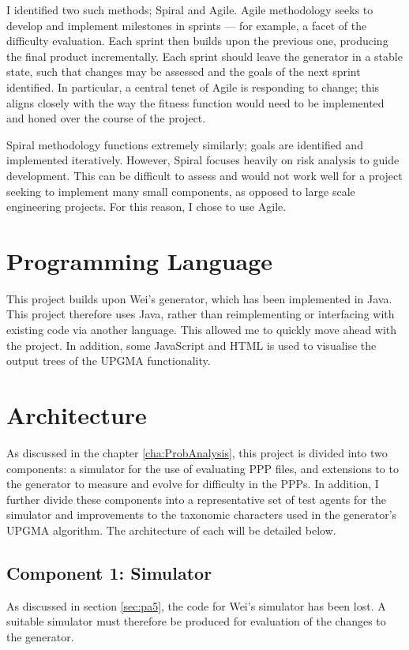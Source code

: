 \documentclass[authoryearcitations]{UoYCSproject}
\begin{document}
I identified two such methods; Spiral and Agile. Agile methodology \cite{agile} seeks to develop and implement milestones in sprints --- for example, a facet of the difficulty evaluation. Each sprint then builds upon the previous one, producing the final product incrementally. Each sprint should leave the generator in a stable state, such that changes may be assessed and the goals of the next sprint identified. In particular, a central tenet of Agile is responding to change; this aligns closely with the way the fitness function would need to be implemented and honed over the course of the project.

Spiral methodology \cite{spiral} functions extremely similarly; goals are identified and implemented iteratively. However, Spiral focuses heavily on risk analysis to guide development. This can be difficult to assess and would not work well for a project seeking to implement many small components, as opposed to large scale engineering projects. For this reason, I chose to use Agile.


\section{Programming Language}
\label{sec:da_2}

This project builds upon Wei's generator, which has been implemented in Java. This project therefore uses Java, rather than reimplementing or interfacing with existing code via another language. This allowed me to quickly move ahead with the project. In addition, some JavaScript and HTML is used to visualise the output trees of the UPGMA functionality.


\section{Architecture}
\label{sec:da_3}

As discussed in the chapter \ref{cha:ProbAnalysis}, this project is divided into two components: a simulator for the use of evaluating PPP files, and extensions to to the generator to measure and evolve for difficulty in the PPPs. In addition, I further divide these components into a representative set of test agents for the simulator and improvements to the taxonomic characters used in the generator's UPGMA algorithm. The architecture of each will be detailed below.

\subsection{Component 1: Simulator}
\label{sec:da_3_1}
As discussed in section \ref{sec:pa5}, the code for Wei's simulator has been lost. A suitable simulator must therefore be produced for evaluation of the changes to the generator.
\end{document}
